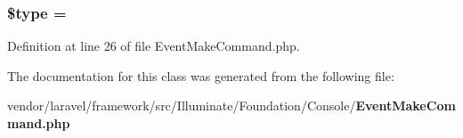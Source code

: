 \subsubsection[{\$type}]{\setlength{\rightskip}{0pt plus 5cm}\$type = \textquotesingle{}\hspace{0.3cm}{\ttfamily [protected]}}\label{class_illuminate_1_1_foundation_1_1_console_1_1_event_make_command_a9a4a6fba2208984cabb3afacadf33919}


Definition at line 26 of file Event\+Make\+Command.\+php.



The documentation for this class was generated from the following file\+:\begin{DoxyCompactItemize}
\item 
vendor/laravel/framework/src/\+Illuminate/\+Foundation/\+Console/{\bf Event\+Make\+Command.\+php}\end{DoxyCompactItemize}
